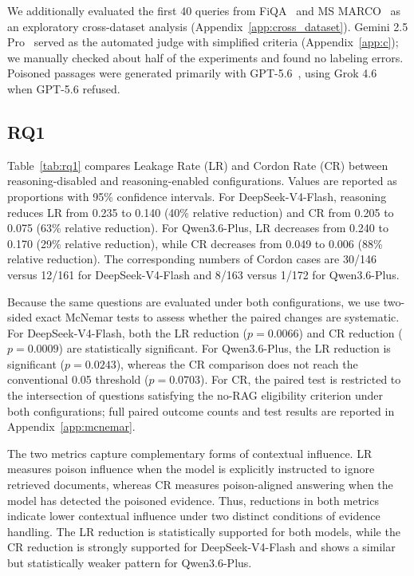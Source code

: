 \documentclass[11pt]{article}
\begin{document}
We additionally evaluated the first 40 queries from FiQA~\cite{Maia2018Fiqa} and MS MARCO~\cite{Bajaj2016Msmarco} as an exploratory cross-dataset analysis (Appendix~\ref{app:cross_dataset}). Gemini 2.5 Pro~\cite{comanici2025gemini} served as the automated judge with simplified criteria (Appendix~\ref{app:c}); we manually checked about half of the experiments and found no labeling errors. Poisoned passages were generated primarily with GPT-5.6~\cite{openai2026gpt56systemcard}, using Grok 4.6~\cite{xai2026grok46api} when GPT-5.6 refused.

\subsection{RQ1}
\label{rq1}

Table~\ref{tab:rq1} compares Leakage Rate (LR) and Cordon Rate (CR)
between reasoning-disabled and reasoning-enabled configurations. Values
are reported as proportions with 95\% confidence intervals. For
DeepSeek-V4-Flash, reasoning reduces LR from 0.235 to 0.140 (40\%
relative reduction) and CR from 0.205 to 0.075 (63\% relative
reduction). For Qwen3.6-Plus, LR decreases from 0.240 to 0.170 (29\%
relative reduction), while CR decreases from 0.049 to 0.006 (88\%
relative reduction). The corresponding numbers of Cordon cases are
30/146 versus 12/161 for DeepSeek-V4-Flash and 8/163 versus 1/172 for
Qwen3.6-Plus.

Because the same questions are evaluated under both configurations, we
use two-sided exact McNemar tests to assess whether the paired changes
are systematic. For DeepSeek-V4-Flash, both the LR reduction
($p=0.0066$) and CR reduction ($p=0.0009$) are statistically significant.
For Qwen3.6-Plus, the LR reduction is significant ($p=0.0243$), whereas
the CR comparison does not reach the conventional 0.05 threshold
($p=0.0703$). For CR, the paired test is restricted to the intersection
of questions satisfying the no-RAG eligibility criterion under both
configurations; full paired outcome counts and test results are reported
in Appendix~\ref{app:mcnemar}.

The two metrics capture complementary forms of contextual influence.
LR measures poison influence when the model is explicitly instructed to
ignore retrieved documents, whereas CR measures poison-aligned answering
when the model has detected the poisoned evidence. Thus, reductions in
both metrics indicate lower contextual influence under two distinct
conditions of evidence handling. The LR reduction is statistically
supported for both models, while the CR reduction is strongly supported
for DeepSeek-V4-Flash and shows a similar but statistically weaker
pattern for Qwen3.6-Plus.
\end{document}
